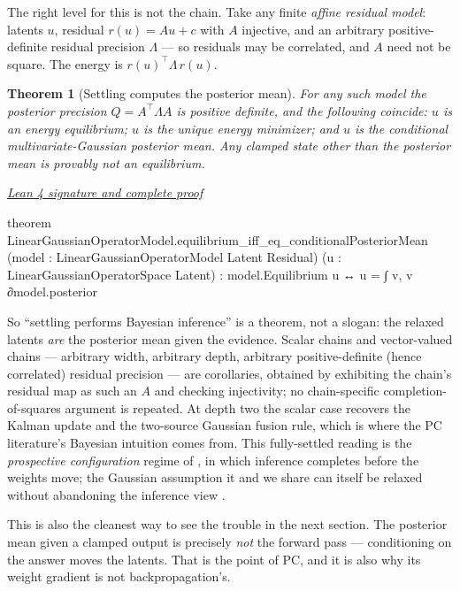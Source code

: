 \documentclass[11pt]{article}
\newtheorem{theorem}{Theorem}[section]
\newcommand{\leancommit}{f3a31db36bb2f944312ee31c1d86c2758109e83a}
\newcommand{\leansignaturelink}[2]{%
  \par\Needspace{0.3\textheight}\smallskip\noindent
  \href{https://github.com/zariuq/MeTTapedia/blob/\leancommit/#1\#L#2}{%
    \scriptsize\itshape Lean 4 signature and complete proof}\par\nobreak}
\begin{document}
The right level for this is not the chain. Take any finite \emph{affine residual model}:
latents $u$, residual $r(u) = Au + c$ with $A$ injective, and an arbitrary
positive-definite residual precision $\Lambda$ --- so residuals may be correlated, and
$A$ need not be square. The energy is $r(u)^\top \Lambda\, r(u)$.

\begin{theorem}[Settling computes the posterior mean]\label{thm:bayes}
For any such model the posterior precision $Q = A^\top \Lambda A$ is positive definite,
and the following coincide: $u$ is an energy equilibrium; $u$ is the unique energy
minimizer; and $u$ is the conditional multivariate-Gaussian posterior mean. Any clamped
state other than the posterior mean is provably not an equilibrium.
\end{theorem}

\leansignaturelink{lean/mettapedia/Mettapedia/MachineLearning/NeuralNetworks/%
PredictiveCoding/LinearGaussianOperator.lean}{254}
\begin{leansignature}
theorem LinearGaussianOperatorModel.equilibrium_iff_eq_conditionalPosteriorMean
    (model : LinearGaussianOperatorModel Latent Residual)
    (u : LinearGaussianOperatorSpace Latent) :
    model.Equilibrium u ↔ u = ∫ v, v ∂model.posterior
\end{leansignature}

So ``settling performs Bayesian inference'' is a theorem, not a slogan: the relaxed
latents \emph{are} the posterior mean given the evidence. Scalar chains and
vector-valued chains --- arbitrary width, arbitrary depth, arbitrary positive-definite
(hence correlated) residual precision --- are corollaries, obtained by exhibiting the
chain's residual map as such an $A$ and checking injectivity; no chain-specific
completion-of-squares argument is repeated. At depth two the scalar case recovers the
Kalman update and the two-source Gaussian fusion rule, which is where the PC
literature's Bayesian intuition comes from. This fully-settled reading is the
\emph{prospective configuration} regime of \cite{millidge2023}, in which inference
completes before the weights move; the Gaussian assumption it and we share can itself be
relaxed without abandoning the inference view \cite{pinchetti2022}.

This is also the cleanest way to see the trouble in the next section. The posterior mean
given a clamped output is precisely \emph{not} the forward pass --- conditioning on the
answer moves the latents. That is the point of PC, and it is also why its weight gradient
is not backpropagation's.
\end{document}

